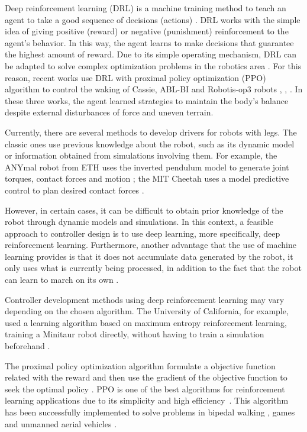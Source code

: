 Deep reinforcement learning (DRL) is a machine training method to teach an agent to take a good sequence of decisions (actions) \cite{sutton2018reinforcement}. DRL works with the simple idea of giving positive (reward) or negative (punishment) reinforcement to the agent's behavior. In this way, the agent learns to make decisions that guarantee the highest amount of reward. Due to its simple operating mechanism, DRL can be adapted to solve complex optimization problems in the robotics area \cite{kober2013reinforcement}. For this reason, recent works use DRL with proximal policy optimization (PPO) algorithm to control the waking of Cassie, ABL-BI and Robotis-op3 robots \cite{xie2018feedback}, \cite{beranek2021behavior}, \cite{jiang2020motion}. In these three works, the agent learned strategies to maintain the body's balance despite external disturbances of force and uneven terrain. 

Currently, there are several methods to develop drivers for robots with legs. The classic ones use previous knowledge about the robot, such as its dynamic model or information obtained from simulations involving them. For example, the ANYmal robot from ETH uses the inverted pendulum model to generate joint torques, contact forces and motion \cite{anymal}; the MIT Cheetah uses a model predictive control to plan desired contact forces \cite{cheetah}.

However, in certain cases, it can be difficult to obtain prior knowledge of the robot through dynamic models and simulations. In this context, a feasible approach to controller design is to use deep learning, more specifically, deep reinforcement learning. Furthermore, another advantage that the use of machine learning provides is that it does not accumulate data generated by the robot, it only uses what is currently being processed, in addition to the fact that the robot can learn to march on its own \cite{haarnoja2018learning}.

Controller development methods using deep reinforcement learning may vary depending on the chosen algorithm. The University of California, for example, used a learning algorithm based on maximum entropy reinforcement learning, training a Minitaur robot directly, without having to train a simulation beforehand \cite{haarnoja2018learning}.

The proximal policy optimization algorithm formulate a objective function related with the reward and then use the gradient of the objective function to seek the optimal policy \cite{schulman2017proximal}. PPO is one of the best algorithms for reinforcement learning applications due to its simplicity and high efficiency~\cite{schulman2017proximal}. This algorithm has been successfully implemented to solve problems in bipedal walking \cite{melo2019learning}, games \cite{kristensen2020strategies} and unmanned aerial vehicles \cite{bohn2019deep}.


